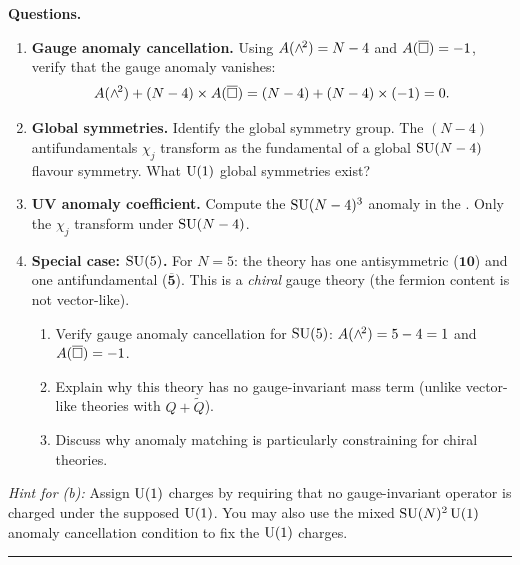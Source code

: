 \documentclass[11pt,a4paper]{article}
\begin{document}
\medskip
\noindent\textbf{Questions.}
\begin{enumerate}[label=(\alph*)]
  \item \textbf{Gauge anomaly cancellation.}
    Using $A(\wedge^{\!2}) = N-4$ and $A(\overline{\square}) = -1$,
    verify that the gauge anomaly vanishes:
    \[
      A(\wedge^{\!2}) + (N-4)\times A(\overline{\square}) = (N-4) + (N-4)\times(-1) = 0.
    \]
  \item \textbf{Global symmetries.}
    Identify the global symmetry group.  The $(N-4)$ antifundamentals
    $\chi_j$ transform as the fundamental of a global $\mathrm{SU}(N-4)$ flavour
    symmetry.  What $\mathrm{U}(1)$ global symmetries exist?
  \item \textbf{UV anomaly coefficient.}
    Compute the $\mathrm{SU}(N-4)^3$ anomaly in the \UV.  Only the $\chi_j$
    transform under $\mathrm{SU}(N-4)$.
  \item \textbf{Special case: $\mathrm{SU}(5)$.}
    For $N = 5$: the theory has one antisymmetric ($\mathbf{10}$) and
    one antifundamental ($\overline{\mathbf{5}}$).  This is a \emph{chiral}
    gauge theory (the fermion content is not vector-like).
    \begin{enumerate}[label=(\roman*)]
      \item Verify gauge anomaly cancellation for $\mathrm{SU}(5)$:
        $A(\wedge^{\!2}) = 5 - 4 = 1$ and $A(\overline{\square}) = -1$.
      \item Explain why this theory has no gauge-invariant mass term
        (unlike vector-like theories with $Q + \widetilde{Q}$).
      \item Discuss why anomaly matching is particularly constraining
        for chiral theories.
    \end{enumerate}
\end{enumerate}

\noindent\textit{Hint for (b):} Assign $\mathrm{U}(1)$ charges by requiring that
no gauge-invariant operator is charged under the supposed $\mathrm{U}(1)$.
You may also use the mixed $\mathrm{SU}(N)^2\,\mathrm{U}(1)$ anomaly cancellation
condition to fix the $\mathrm{U}(1)$ charges.

\bigskip
\hrule
\bigskip
\end{document}
